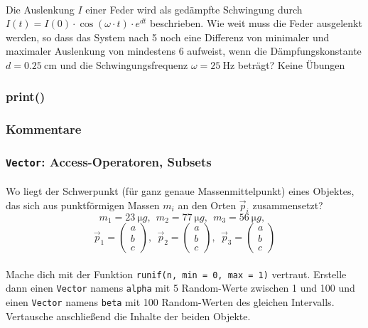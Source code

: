 \documentclass[paper=A4, pagesize, DIV=calc, smallheadings,
fontsize=11pt, expansion=false]{scrreprt}
\begin{document}
\paragraph{}
Die Auslenkung $I$ einer Feder wird als gedämpfte Schwingung durch
$I(t) = I(0) \cdot \cos(\omega \cdot t) \cdot e^{dt}$ beschrieben.
Wie weit muss die Feder ausgelenkt werden, so dass das System nach \SI{5}{\min}
noch eine Differenz von minimaler und maximaler Auslenkung von mindestens \SI{6}{} aufweist, wenn die 
Dämpfungskonstante $d = 
\SI{0.25}{\cm}$ und die Schwingungsfrequenz $\omega = \SI{25}{\text{Hz}}$ beträgt?
Keine Übungen


\subsubsection*{print()}

\subsubsection*{Kommentare}

\subsubsection*{\texttt{\textbf{Vector}}: Access-Operatoren, Subsets}

\paragraph{}
Wo liegt der Schwerpunkt (für ganz genaue \glqq Massenmittelpunkt\grqq) eines Objektes, das sich aus punktförmigen 
Massen $m_i$ an 
den Orten $\vec{p}_i$ zusammensetzt?
\[
m_1 = \SI{23}{\micro g},~~ 
m_2 = \SI{77}{\micro g},~~
m_3 = \SI{56}{\micro g},~~
 \]
 \[
\vec{p}_1 = \begin{pmatrix}a \\ b \\ c\end{pmatrix},~~ 
\vec{p}_2 = \begin{pmatrix}a \\ b \\ c\end{pmatrix},~~ 
\vec{p}_3 = \begin{pmatrix}a \\ b \\ c\end{pmatrix}
\]

\paragraph{}
Mache dich mit der Funktion \texttt{runif(n, min = 0, max = 1)} vertraut. Erstelle dann einen \texttt{Vector} 
namens \texttt{alpha} mit 5 
Random-Werte zwischen 1 und 100 und einen \texttt{Vector} namens \texttt{beta} mit 100 Random-Werten des gleichen 
Intervalls.
Vertausche anschließend die Inhalte der beiden Objekte.
\end{document}
